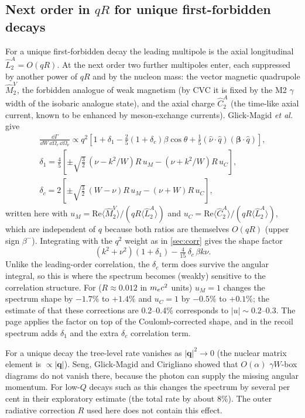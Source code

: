 \subsection{Next order in $qR$ for unique first-forbidden decays}
For a unique first-forbidden decay the leading multipole is the axial longitudinal $\hat L^A_2 = O(qR)$. At the next order two further multipoles enter, each suppressed by another power of $qR$ and by the nucleon mass: the vector magnetic quadrupole $\hat M^V_2$, the forbidden analogue of weak magnetism (by CVC it is fixed by the M2 $\gamma$ width of the isobaric analogue state), and the axial charge $\hat C^A_2$ (the time-like axial current, known to be enhanced by meson-exchange currents). Glick-Magid \emph{et al.}\ \cite{gm17} give
\begin{gather}
\frac{\dd\Gamma}{\dd W\,\dd\Omega_e\,\dd\Omega_\nu} \propto q^2\left[1 + \delta_1 - \tfrac25(1 + \delta_c)\beta\cos\theta + \tfrac15(\hat\nu\cdot\hat q)(\bm\beta\cdot\hat q)\right],\\
\delta_1 = \tfrac45\left[\pm\sqrt{\tfrac32}\,(\nu - k^2/W)R\,u_M - (\nu + k^2/W)R\,u_C\right],\nonumber\\
\delta_c = 2\left[\pm\sqrt{\tfrac32}\,(W - \nu)R\,u_M - (\nu + W)R\,u_C\right],\nonumber
\end{gather}
written here with $u_M = \mathrm{Re}\langle\hat M^V_2\rangle/(qR\langle\hat L^A_2\rangle)$ and $u_C = \mathrm{Re}\langle\hat C^A_2\rangle/(qR\langle\hat L^A_2\rangle)$, which are independent of $q$ because both ratios are themselves $O(qR)$ (upper sign $\beta^-$). Integrating with the $q^2$ weight as in \cref{sec:corr} gives the shape factor
\begin{equation}
(k^2 + \nu^2)(1 + \delta_1) - \tfrac{4}{15}\,\delta_c\,\beta k\nu .
\end{equation}
Unlike the leading-order correlation, the $\delta_c$ term does survive the angular integral, so this is where the spectrum becomes (weakly) sensitive to the correlation structure. For  ($R \approx 0.012$ in $m_e c^2$ units) $u_M = 1$ changes the spectrum shape by $-1.7\%$ to $+1.4\%$ and $u_C = 1$ by $-0.5\%$ to $+0.1\%$; the estimate of \cite{gm17} that these corrections are 0.2--0.4\% corresponds to $|u| \sim 0.2$--$0.3$. The page applies the factor on top of the Coulomb-corrected shape, and in the recoil spectrum adds $\delta_1$ and the extra $\delta_c$ correlation term.

\begin{pitfall}
For a unique decay the tree-level rate vanishes as $|\bm q|^2 \to 0$ (the nuclear matrix element is $\propto|\bm q|$). Seng, Glick-Magid and Cirigliano \cite{seng} showed that $O(\alpha)$ $\gamma W$-box diagrams do not vanish there, because the photon can supply the missing angular momentum. For low-$Q$ decays such as  this changes the spectrum by several per cent in their exploratory estimate (the total rate by about 8\%). The outer radiative correction $R$ used here does not contain this effect.
\end{pitfall}


